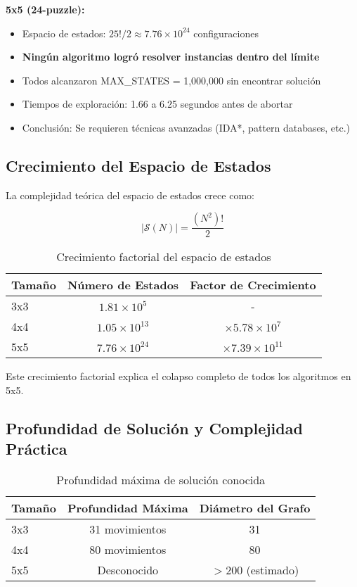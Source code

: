 \documentclass[12pt,a4paper]{article}
\begin{document}
\textbf{5x5 (24-puzzle):}
\begin{itemize}
    \item Espacio de estados: $25!/2 \approx 7.76 \times 10^{24}$ configuraciones
    \item \textbf{Ningún algoritmo logró resolver instancias dentro del límite}
    \item Todos alcanzaron MAX\_STATES = 1,000,000 sin encontrar solución
    \item Tiempos de exploración: 1.66 a 6.25 segundos antes de abortar
    \item Conclusión: Se requieren técnicas avanzadas (IDA*, pattern databases, etc.)
\end{itemize}

\subsection{Crecimiento del Espacio de Estados}

La complejidad teórica del espacio de estados crece como:

\begin{equation}
|\mathcal{S}(N)| = \frac{(N^2)!}{2}
\end{equation}

\begin{table}[H]
\centering
\caption{Crecimiento factorial del espacio de estados}
\label{tab:state_space_growth}
\begin{tabular}{@{}lcc@{}}
\toprule
\textbf{Tamaño} & \textbf{Número de Estados} & \textbf{Factor de Crecimiento} \\
\midrule
3x3 & $1.81 \times 10^5$ & - \\
4x4 & $1.05 \times 10^{13}$ & $\times 5.78 \times 10^7$ \\
5x5 & $7.76 \times 10^{24}$ & $\times 7.39 \times 10^{11}$ \\
\bottomrule
\end{tabular}
\end{table}

Este crecimiento factorial explica el colapso completo de todos los algoritmos en 5x5.

\subsection{Profundidad de Solución y Complejidad Práctica}

\begin{table}[H]
\centering
\caption{Profundidad máxima de solución conocida}
\label{tab:max_depth}
\begin{tabular}{@{}lcc@{}}
\toprule
\textbf{Tamaño} & \textbf{Profundidad Máxima} & \textbf{Diámetro del Grafo} \\
\midrule
3x3 & 31 movimientos & 31 \\
4x4 & 80 movimientos & 80 \\
5x5 & Desconocido & $>200$ (estimado) \\
\bottomrule
\end{tabular}
\end{table}
\end{document}
